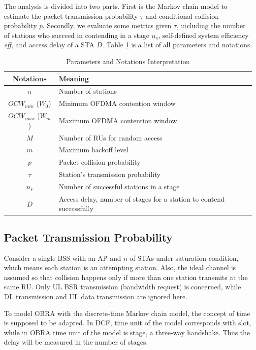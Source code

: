 \documentclass[journal]{IEEEtran}
\begin{document}
The analysis is divided into two parts. First is the Markov chain model to estimate the packet transmission probability $\tau$ and conditional collision probability $p$. 
Secondly, we evaluate some metrics given $\tau$, including the number of stations who succeed in contending in a stage $n_s$, self-defined system efficiency \textit{eff}, and access delay of a STA $D$.  
Table \ref{table_notation} is a list of all parameters and notations.


\begin{table}[!h]
\caption{Parameters and Notations Interpretation}
\centering
\label{table_notation}
\begin{tabular}{c|m{4.5cm}}
\hline
Notations				& Meaning \\
\hline
$n$						& Number of stations \\
$OCW_{min}$ ($W_0$)		& Minimum OFDMA contention window \\
$OCW_{max}$ ($W_m$)		& Maximum OFDMA contention window \\
$M$						& Number of RUs for random access \\
$m$						& Maximum backoff level \\
$p$						& Packet collision probability \\
$\tau$					& Station's transmission probability \\
$n_s$					& Number of successful stations in a stage \\
$D$						& Access delay, number of stages for a station to contend successfully \\
\hline
\end{tabular}
\end{table}

\subsection{Packet Transmission Probability}
Consider a single BSS with an AP and $n$ of STAs under saturation condition, which means each station is an attempting station. 
Also, the ideal channel is assumed so that collision happens only if more than one station transmits at the same RU.
Only UL BSR transmission (bandwidth request) is concerned, while DL transmission and UL data transmission are ignored here. 

To model OBRA with the discrete-time Markov chain model, the concept of time is supposed to be adapted. 
In DCF, time unit of the model corresponds with slot, while in OBRA time unit of the model is stage, a three-way handshake. 
Thus the delay will be measured in the number of stages.
\end{document}
